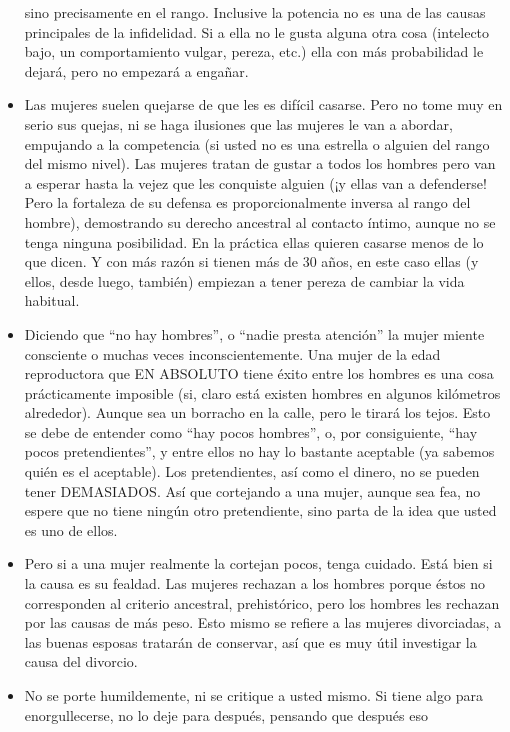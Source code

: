 \begin{itemize}
  sino precisamente en el rango. Inclusive la potencia no es una de las
  causas principales de la infidelidad. Si a ella no le gusta alguna
  otra cosa (intelecto bajo, un comportamiento vulgar, pereza, etc.)
  ella con más probabilidad le dejará, pero no empezará a engañar.
\item
  Las mujeres suelen quejarse de que les es difícil casarse. Pero no
  tome muy en serio sus quejas, ni se haga ilusiones que las mujeres le
  van a abordar, empujando a la competencia (si usted no es una estrella
  o alguien del rango del mismo nivel). Las mujeres tratan de gustar a
  todos los hombres pero van a esperar hasta la vejez que les conquiste
  alguien (¡y ellas van a defenderse! Pero la fortaleza de su defensa es
  proporcionalmente inversa al rango del hombre), demostrando su derecho
  ancestral al contacto íntimo, aunque no se tenga ninguna posibilidad.
  En la práctica ellas quieren casarse menos de lo que dicen. Y con más
  razón si tienen más de 30 años, en este caso ellas (y ellos, desde
  luego, también) empiezan a tener pereza de cambiar la vida habitual.
\item
  Diciendo que ``no hay hombres'', o ``nadie presta atención'' la mujer
  miente consciente o muchas veces inconscientemente. Una mujer de la
  edad reproductora que EN ABSOLUTO tiene éxito entre los hombres es una
  cosa prácticamente imposible (si, claro está existen hombres en
  algunos kilómetros alrededor). Aunque sea un borracho en la calle,
  pero le tirará los tejos. Esto se debe de entender como ``hay pocos
  hombres'', o, por consiguiente, ``hay pocos pretendientes'', y entre
  ellos no hay lo bastante aceptable (ya sabemos quién es el aceptable).
  Los pretendientes, así como el dinero, no se pueden tener DEMASIADOS.
  Así que cortejando a una mujer, aunque sea fea, no espere que no tiene
  ningún otro pretendiente, sino parta de la idea que usted es uno de
  ellos.
\item
  Pero si a una mujer realmente la cortejan pocos, tenga cuidado. Está
  bien si la causa es su fealdad. Las mujeres rechazan a los hombres
  porque éstos no corresponden al criterio ancestral, prehistórico, pero
  los hombres les rechazan por las causas de más peso. Esto mismo se
  refiere a las mujeres divorciadas, a las buenas esposas tratarán de
  conservar, así que es muy útil investigar la causa del divorcio.
\item
  No se porte humildemente, ni se critique a usted mismo. Si tiene algo
  para enorgullecerse, no lo deje para después, pensando que después eso

\end{itemize}
